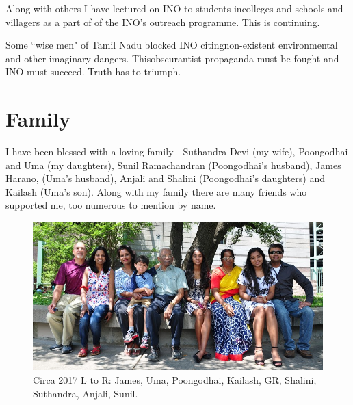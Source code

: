 Along with others I have lectured on INO to students in\break colleges and 
schools and villagers as a part of of the INO's outreach programme. This 
is continuing.
\medskip
  
Some ``wise men" of Tamil Nadu blocked INO citing\break non-existent 
environmental and other imaginary dangers. This\break obscurantist propaganda 
must be fought and INO must succeed. Truth has to triumph.

\vspace{-\topsep}
\section*{Family}

I have been blessed with a loving family - Suthandra Devi (my wife), 
Poongodhai and Uma (my daughters), Sunil Ramachandran (Poongodhai's 
husband), James Harano, (Uma's husband), Anjali and Shalini 
(Poongodhai's daughters) and Kailash (Uma's son).
Along with my family there are many friends who supported me, too 
numerous to mention by name.
\bigskip

\begin{figure}[h]
\centering
\includegraphics[width=\textwidth]{images/Rajaji-family-1.jpg}
\caption{Circa 2017 L to R: James, Uma, Poongodhai, Kailash, GR, 
Shalini, Suthandra, Anjali, Sunil.}
\end{figure}

